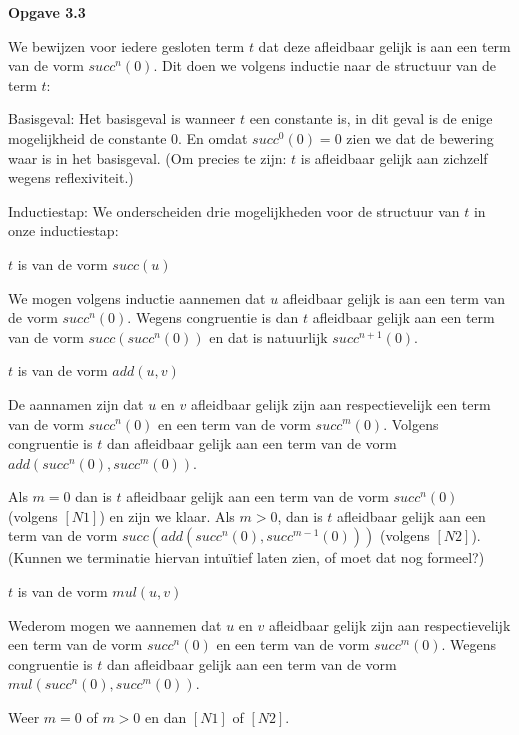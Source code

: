 \documentclass[a4paper,11pt]{article}
\begin{document}
{\bf Opgave 3.3}

We bewijzen voor iedere gesloten term $t$ dat deze afleidbaar gelijk is aan
een term van de vorm $succ^{n}(0)$. Dit doen we volgens inductie naar de
structuur van de term $t$:

\begin{description}

\item{Basisgeval:}
  Het basisgeval is wanneer $t$ een constante is, in dit geval is de enige
  mogelijkheid de constante $0$. En omdat $succ^0(0) = 0$ zien we dat de
  bewering waar is in het basisgeval. (Om precies te zijn: $t$ is afleidbaar
  gelijk aan zichzelf wegens reflexiviteit.)

\item{Inductiestap:}
  We onderscheiden drie mogelijkheden voor de structuur van $t$ in onze
  inductiestap:

  \begin{description}

  \item{$t$ is van de vorm $succ(u)$}

    We mogen volgens inductie aannemen dat $u$ afleidbaar gelijk is aan een
    term van de vorm $succ^{n}(0)$. Wegens congruentie is dan $t$ afleidbaar
    gelijk aan een term van de vorm $succ(succ^{n}(0))$ en dat is natuurlijk
    $succ^{n+1}(0)$.

  \item{$t$ is van de vorm $add(u, v)$}

    De aannamen zijn dat $u$ en $v$ afleidbaar gelijk zijn aan respectievelijk
    een term van de vorm $succ^{n}(0)$ en een term van de vorm
    $succ^{m}(0)$. Volgens congruentie is $t$ dan afleidbaar gelijk aan een
    term van de vorm $add(succ^{n}(0), succ^{m}(0))$.

    Als $m=0$ dan is $t$ afleidbaar gelijk aan een term van de vorm
    $succ^{n}(0)$ (volgens $[N1]$) en zijn we klaar. Als $m>0$, dan is $t$
    afleidbaar gelijk aan een term van de vorm $succ(add(succ^{n}(0),
    succ^{m-1}(0)))$ (volgens $[N2]$). (Kunnen we terminatie hiervan
    intu\"itief laten zien, of moet dat nog formeel?)

  \item{$t$ is van de vorm $mul(u, v)$}

    Wederom mogen we aannemen dat $u$ en $v$ afleidbaar gelijk zijn aan
    respectievelijk een term van de vorm $succ^{n}(0)$ en een term van de vorm
    $succ^{m}(0)$. Wegens congruentie is $t$ dan afleidbaar gelijk aan een
    term van de vorm $mul(succ^{n}(0), succ^{m}(0))$.

    Weer $m=0$ of $m>0$ en dan $[N1]$ of $[N2]$.

  \end{description}

\end{description}
\end{document}

